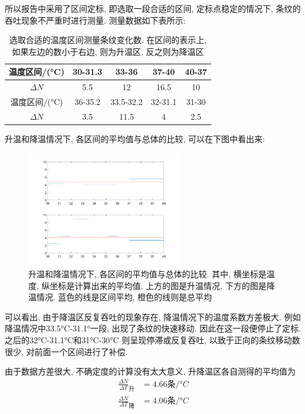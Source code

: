 \documentclass[12pt,a4paper]{article}
\begin{document}
所以报告中采用了区间定标, 即选取一段合适的区间, 定标点稳定的情况下, 条纹的吞吐现象不严重时进行测量. 测量数据如下表所示: 
\begin{table}[H]
    \centering
    \begin{tabular}{|c|c|c|c|c|} 
    \hline
    温度区间/(°C)                 & 30-31.3 & 33-36     & 37-40   & 40-37  \\ 
    \hline
    $\Delta N$ & 5.5     & 12        & 16.5    & 10     \\ 
    \hline
    温度区间/(°C)                 & 36-35.2 & 33.5-32.2 & 32-31.1 & 31-30  \\ 
    \hline
    $\Delta N$ & 3.5     & 11.5      & 4       & 2.5    \\
    \hline
    \end{tabular}
    \caption{选取合适的温度区间测量条纹变化数. 在区间的表示上, 如果左边的数小于右边, 则为升温区, 反之则为降温区}
    \end{table}
升温和降温情况下, 各区间的平均值与总体的比较, 可以在下图中看出来:

    \begin{figure}[H]
        \centering
        
        \includegraphics[width=0.6\textwidth]{fig1.png}
        \caption{升温和降温情况下, 各区间的平均值与总体的比较. 其中, 横坐标是温度, 纵坐标是计算出来的平均值. 
        上方的图是升温情况, 下方的图是降温情况. 蓝色的线是区间平均, 橙色的线则是总平均}
    \end{figure} 

可以看出, 由于降温区反复吞吐的现象存在, 降温情况下的温度系数方差极大. 例如降温情况中33.5°C-31.1°一段, 出现了条纹的快速移动. 因此在这一段便停止了定标. 之后的32°C-31.1°C和31°C-30°C
则呈现停滞或反复吞吐, 以致于正向的条纹移动数很少, 对前面一个区间进行了补偿. 


由于数据方差很大, 不确定度的计算没有太大意义. 升降温区各自测得的平均值为
\begin{equation}
    \begin{aligned}
        \frac{\Delta N}{\Delta T}_{\text{升}}&=4.66\text{条}/°C
        \\
        \frac{\Delta N}{\Delta T}_{\text{降}}&=4.06\text{条}/°C
    \end{aligned}
\end{equation}
\end{document}
